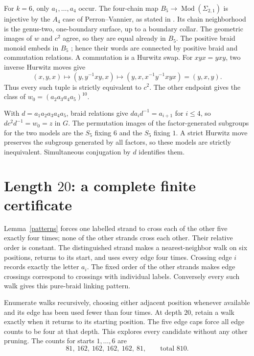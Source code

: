 \documentclass[11pt]{article}
\newcommand{\Mod}{\operatorname{Mod}}
\begin{document}
For \(k=6\), only \(a_1,\ldots,a_4\) occur.
The four-chain map \(B_5\to\Mod(\Sigma_{2,1})\) is injective by
the \(A_4\) case of Perron--Vannier, as stated in
\cite[Theorem 2.1]{W}. Its chain neighborhood is the genus-two,
one-boundary surface, up to a boundary collar.
The geometric images of \(w\) and \(c^2\) agree, so they are equal
already in \(B_5\).
The positive braid monoid embeds in \(B_5\) \cite[Section 4]{GM};
hence their words are connected by positive braid and commutation
relations.
A commutation is a Hurwitz swap. For \(xyx=yxy\), two inverse
Hurwitz moves give
\[
 (x,y,x)\longmapsto(y,y^{-1}xy,x)
 \longmapsto(y,x,x^{-1}y^{-1}xyx)=(y,x,y).
\]
Thus every such tuple is strictly equivalent to \(c^2\).
The other endpoint gives the class of
\(w_0=(a_2a_3a_4a_5)^{10}\).

With \(d=a_1a_2a_3a_4a_5\), braid relations give
\(da_i d^{-1}=a_{i+1}\) for \(i\leq4\), so
\(dc^2d^{-1}=w_0=z\) in \(G\).
The permutation images of the factor-generated subgroups for the
two models are the \(S_5\) fixing \(6\) and the \(S_5\) fixing \(1\).
A strict Hurwitz move preserves the subgroup generated by all
factors, so these models are strictly inequivalent.
Simultaneous conjugation by \(d\) identifies them.

\section{Length \texorpdfstring{\(20\)}{20}: a complete finite certificate}
Lemma~\ref{patterns} forces one labelled strand to cross each
of the other five exactly four times; none of the other strands
cross each other. Their relative order is constant.
The distinguished strand makes a nearest-neighbor walk on six
positions, returns to its start, and uses every edge four times.
Crossing edge \(i\) records exactly the letter \(a_i\).
The fixed order of the other strands makes edge crossings
correspond to crossings with individual labels.
Conversely every such walk gives this pure-braid linking pattern.

Enumerate walks recursively, choosing either adjacent position
whenever available and its edge has been used fewer than four
times. At depth \(20\), retain a walk exactly when it returns to
its starting position. The five edge caps force all edge counts
to be four at that depth. This explores every candidate without
any other pruning.
The counts for starts \(1,\ldots,6\) are
\[
 81,\ 162,\ 162,\ 162,\ 162,\ 81,
 \qquad \text{total }810.
\]
\end{document}
